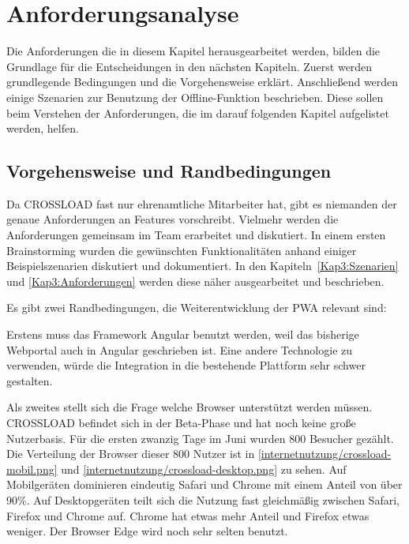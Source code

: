 \chapter{Anforderungsanalyse}
\label{Kap3}
Die Anforderungen die in diesem Kapitel herausgearbeitet werden, bilden die Grundlage für die Entscheidungen in den nächsten Kapiteln. Zuerst werden grundlegende Bedingungen und die Vorgehensweise erklärt. Anschließend werden einige Szenarien zur Benutzung der Offline-Funktion beschrieben. Diese sollen beim Verstehen der Anforderungen, die im darauf folgenden Kapitel aufgelistet werden, helfen.

\section{Vorgehensweise und Randbedingungen}
Da CROSSLOAD fast nur ehrenamtliche Mitarbeiter hat, gibt es niemanden der genaue Anforderungen an Features vorschreibt. Vielmehr werden die Anforderungen gemeinsam im Team erarbeitet und diskutiert. In einem ersten Brainstorming wurden die gewünschten Funktionalitäten anhand einiger Beispielszenarien diskutiert und dokumentiert. In den Kapiteln~\ref{Kap3:Szenarien} und \ref{Kap3:Anforderungen} werden diese näher ausgearbeitet und beschrieben.

Es gibt zwei Randbedingungen, die Weiterentwicklung der \ac{PWA} relevant sind:

Erstens muss das Framework Angular benutzt werden, weil das bisherige Webportal auch in Angular geschrieben ist. Eine andere Technologie zu verwenden, würde die Integration in die bestehende Plattform sehr schwer gestalten. 

Als zweites stellt sich die Frage welche Browser unterstützt werden müssen. CROSSLOAD befindet sich in der Beta-Phase und hat noch keine große Nutzerbasis. Für die ersten zwanzig Tage im Juni wurden 800 Besucher gezählt. Die Verteilung der Browser dieser 800 Nutzer ist in \autoref{internetnutzung/crossload-mobil.png} und \autoref{internetnutzung/crossload-desktop.png} zu sehen. Auf Mobilgeräten dominieren eindeutig Safari und Chrome mit einem Anteil von über 90\%. Auf Desktopgeräten teilt sich die Nutzung fast gleichmäßig zwischen Safari, Firefox und Chrome auf. Chrome hat etwas mehr Anteil und Firefox etwas weniger. Der Browser Edge wird noch sehr selten benutzt.



